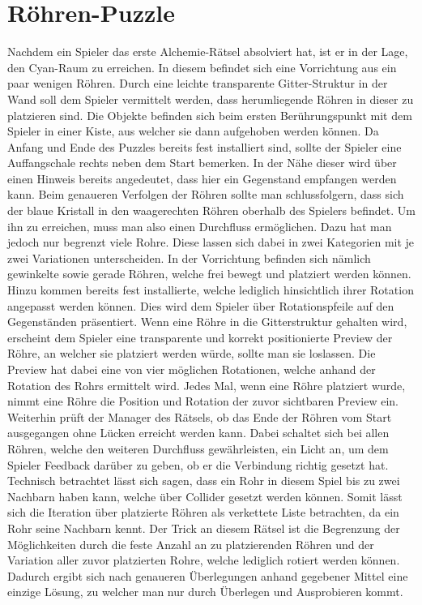 \section{Röhren-Puzzle}
Nachdem ein Spieler das erste Alchemie-Rätsel absolviert hat, ist er in der Lage, den Cyan-Raum zu erreichen. In diesem befindet sich eine Vorrichtung aus ein paar wenigen Röhren. Durch eine leichte transparente Gitter-Struktur in der Wand soll dem Spieler vermittelt werden, dass herumliegende Röhren in dieser zu platzieren sind. Die Objekte befinden sich beim ersten Berührungspunkt mit dem Spieler in einer Kiste, aus welcher sie dann aufgehoben werden können. Da Anfang und Ende des Puzzles bereits fest installiert sind, sollte der Spieler eine Auffangschale rechts neben dem Start bemerken. In der Nähe dieser wird über einen Hinweis bereits angedeutet, dass hier ein Gegenstand empfangen werden kann. Beim genaueren Verfolgen der Röhren sollte man schlussfolgern, dass sich der blaue Kristall in den waagerechten Röhren oberhalb des Spielers befindet. Um ihn zu erreichen, muss man also einen Durchfluss ermöglichen. Dazu hat man jedoch nur begrenzt viele Rohre. Diese lassen sich dabei in zwei Kategorien mit je zwei Variationen unterscheiden. In der Vorrichtung befinden sich nämlich gewinkelte sowie gerade Röhren, welche frei bewegt und platziert werden können. Hinzu kommen bereits fest installierte, welche lediglich hinsichtlich ihrer Rotation angepasst werden können. Dies wird dem Spieler über Rotationspfeile auf den Gegenständen präsentiert. Wenn eine Röhre in die Gitterstruktur gehalten wird, erscheint dem Spieler eine transparente und korrekt positionierte Preview der Röhre, an welcher sie platziert werden würde, sollte man sie loslassen. Die Preview hat dabei eine von vier möglichen Rotationen, welche anhand der Rotation des Rohrs ermittelt wird. Jedes Mal, wenn eine Röhre platziert wurde, nimmt eine Röhre die Position und Rotation der zuvor sichtbaren Preview ein. Weiterhin prüft der Manager des Rätsels, ob das Ende der Röhren vom Start ausgegangen ohne Lücken erreicht werden kann. Dabei schaltet sich bei allen Röhren, welche den weiteren Durchfluss gewährleisten, ein Licht an, um dem Spieler Feedback darüber zu geben, ob er die Verbindung richtig gesetzt hat. Technisch betrachtet lässt sich sagen, dass ein Rohr in diesem Spiel bis zu zwei Nachbarn haben kann, welche über Collider gesetzt werden können. Somit lässt sich die Iteration über platzierte Röhren als verkettete Liste betrachten, da ein Rohr seine Nachbarn kennt. Der Trick an diesem Rätsel ist die Begrenzung der Möglichkeiten durch die feste Anzahl an zu platzierenden Röhren und der Variation aller zuvor platzierten Rohre, welche lediglich rotiert werden können. Dadurch ergibt sich nach genaueren Überlegungen anhand gegebener Mittel eine einzige Lösung, zu welcher man nur durch Überlegen und Ausprobieren kommt.\\
